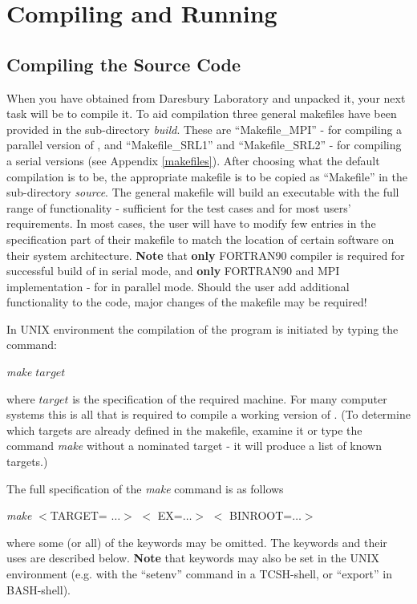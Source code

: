 \section{Compiling and Running \D}

\subsection{Compiling the Source Code}
\label{compilation}

When you have obtained \D from Daresbury Laboratory and unpacked it,
your next task will be to compile it.  To aid compilation three
general makefiles have been provided in the sub-directory {\em
build}.  These are ``Makefile\_MPI'' - for compiling a parallel
version of \D, and ``Makefile\_SRL1'' and ``Makefile\_SRL2'' - for
compiling a serial versions (see Appendix \ref{makefiles}).  After
choosing what the default compilation is to be, the appropriate
makefile is to be copied as ``Makefile'' in the sub-directory {\em
source}.  The general \D makefile will build an executable with the
full range of functionality - sufficient for the test cases and for
most users' requirements.  In most cases, the user will have to
modify few entries in the specification part of their makefile to
match the location of certain software on their system architecture.
{\bf Note} that {\bf only} FORTRAN90 compiler is required for
successful build of \D in serial mode, and {\bf only} FORTRAN90
and MPI implementation - for \D in parallel mode.  Should the user
add additional functionality to the code, major changes of the
makefile may be required!

In UNIX environment the compilation of the program is initiated by
typing the command:

{\em make} $target$

\noindent where $target$ is the specification of the required
machine.  For many computer systems this is all that is required
to compile a working version of \D. (To determine which targets
are already defined in the makefile, examine it or type the
command {\em make} without a nominated target - it will produce a
list of known targets.)

The full specification of the {\em make} command is as follows

{\em make} $<$TARGET= $\ldots >$ $<$ EX=$\ldots >$ $<$
BINROOT=$\ldots >$

\noindent where some (or all) of the keywords may be omitted.
The keywords and their uses are described below.  {\bf Note} that
keywords may also be set in the UNIX environment (e.g. with the
``setenv'' command in a TCSH-shell, or ``export'' in BASH-shell).

